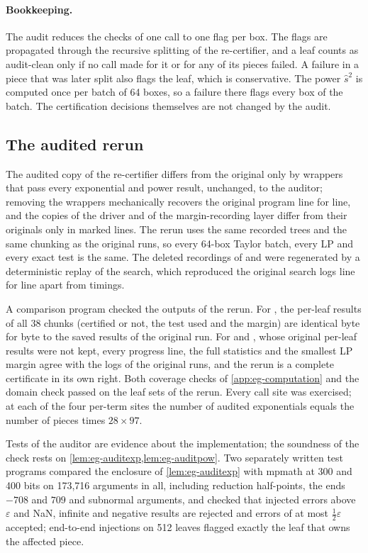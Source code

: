 \paragraph{Bookkeeping.}
The audit reduces the checks of one call to one flag per box.
The flags are propagated through the recursive splitting of the re-certifier, and a leaf counts as audit-clean only if no call made for it or for any of its pieces failed.
A failure in a piece that was later split also flags the leaf, which is conservative.
The power $\hat s^2$ is computed once per batch of 64 boxes, so a failure there flags every box of the batch.
The certification decisions themselves are not changed by the audit.

\subsection{The audited rerun}\label{app:egrounding-run}

The audited copy of the re-certifier differs from the original only by wrappers that pass every exponential and power result, unchanged, to the auditor; removing the wrappers mechanically recovers the original program line for line, and the copies of the driver and of the margin-recording layer differ from their originals only in marked lines.
The rerun uses the same recorded trees and the same chunking as the original runs, so every 64-box Taylor batch, every LP and every exact test is the same.
The deleted recordings of  and  were regenerated by a deterministic replay of the search, which reproduced the original search logs line for line apart from timings.

A comparison program checked the outputs of the rerun.
For , the per-leaf results of all 38 chunks (certified or not, the test used and the margin) are identical byte for byte to the saved results of the original run.
For  and , whose original per-leaf results were not kept, every progress line, the full statistics and the smallest LP margin agree with the logs of the original runs, and the rerun is a complete certificate in its own right.
Both coverage checks of \cref{app:eg-computation} and the domain check passed on the leaf sets of the rerun.
Every call site was exercised; at each of the four per-term sites the number of audited exponentials equals the number of pieces times $28\times97$.

Tests of the auditor are evidence about the implementation; the soundness of the check rests on \cref{lem:eg-auditexp,lem:eg-auditpow}.
Two separately written test programs compared the enclosure of \cref{lem:eg-auditexp} with mpmath at 300 and 400 bits on 173{,}716 arguments in all, including reduction half-points, the ends $-708$ and $709$ and subnormal arguments, and checked that injected errors above $\varepsilon$ and NaN, infinite and negative results are rejected and errors of at most $\frac12\varepsilon$ accepted; end-to-end injections on 512 leaves flagged exactly the leaf that owns the affected piece.

